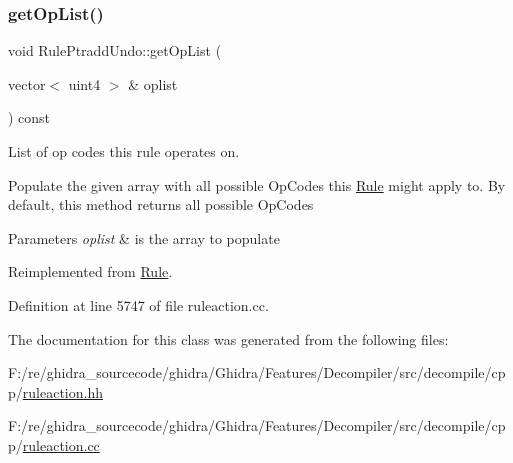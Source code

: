 \subsubsection{\texorpdfstring{getOpList()}{getOpList()}}
{\footnotesize\ttfamily void Rule\+Ptradd\+Undo\+::get\+Op\+List (\begin{DoxyParamCaption}\item[{vector$<$ uint4 $>$ \&}]{oplist }\end{DoxyParamCaption}) const\hspace{0.3cm}{\ttfamily [virtual]}}



List of op codes this rule operates on. 

Populate the given array with all possible Op\+Codes this \mbox{\hyperlink{class_rule}{Rule}} might apply to. By default, this method returns all possible Op\+Codes 
\begin{DoxyParams}{Parameters}
{\em oplist} & is the array to populate \\
\hline
\end{DoxyParams}


Reimplemented from \mbox{\hyperlink{class_rule_a4023bfc7825de0ab866790551856d10e}{Rule}}.



Definition at line 5747 of file ruleaction.\+cc.



The documentation for this class was generated from the following files\+:\begin{DoxyCompactItemize}
\item 
F\+:/re/ghidra\+\_\+sourcecode/ghidra/\+Ghidra/\+Features/\+Decompiler/src/decompile/cpp/\mbox{\hyperlink{ruleaction_8hh}{ruleaction.\+hh}}\item 
F\+:/re/ghidra\+\_\+sourcecode/ghidra/\+Ghidra/\+Features/\+Decompiler/src/decompile/cpp/\mbox{\hyperlink{ruleaction_8cc}{ruleaction.\+cc}}\end{DoxyCompactItemize}

